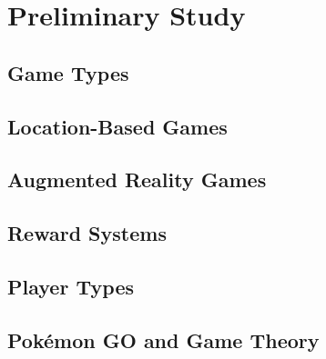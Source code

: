 
\chapter{Preliminary Study}

\section{Game Types}

\section{Location-Based Games}

\section{Augmented Reality Games}

\section{Reward Systems}

\section{Player Types}

\section{Pokémon GO and Game Theory}